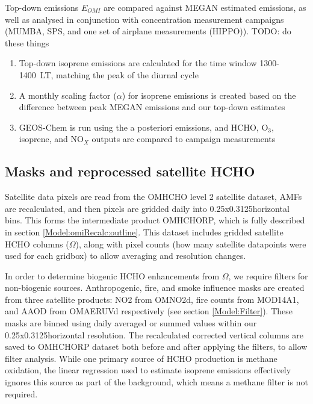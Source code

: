 \begin{enumerate}
        Top-down emissions $E_{OMI}$ are compared against MEGAN estimated emissions, as well as analysed in conjunction with concentration measurement campaigns (MUMBA, SPS, and one set of airplane measurements (HIPPO)).
        TODO: do these things
      \begin{enumerate}
        \item 
          Top-down isoprene emissions are calculated for the time window 1300-1400~LT, matching the peak of the diurnal cycle
        \item 
          A monthly scaling factor ($\alpha$) for isoprene emissions is created based on the difference between peak MEGAN emissions and our top-down estimates
        \item GEOS-Chem is run using the a posteriori emissions, and HCHO, O$_3$, isoprene, and NO$_X$ outputs are compared to campaign measurements
      \end{enumerate}
    \end{enumerate}
    
  
  \subsection{Masks and reprocessed satellite HCHO}
    
    Satellite data pixels are read from the OMHCHO level 2 satellite dataset, AMFs are recalculated, and then pixels are gridded daily into 0.25x0.3125\degr horizontal bins. 
    This forms the intermediate product OMHCHORP, which is fully described in section \ref{Model:omiRecalc:outline}.
    This dataset includes gridded satellite HCHO columns ($\Omega$), along with pixel counts (how many satellite datapoints were used for each gridbox) to allow averaging and resolution changes.
    
    In order to determine biogenic HCHO enhancements from $\Omega$, we require filters for non-biogenic sources.
    Anthropogenic, fire, and smoke influence masks are created from three satellite products: NO2 from OMNO2d, fire counts from MOD14A1, and AAOD from OMAERUVd respectively (see section \ref{Model:Filter}).
    These masks are binned using daily averaged or summed values within our 0.25x0.3125\degr horizontal resolution.
    The recalculated corrected vertical columns are saved to OMHCHORP dataset both before and after applying the filters, to allow filter analysis.
    While one primary source of HCHO production is methane oxidation, the linear regression used to estimate isoprene emissions effectively ignores this source as part of the background, which means a methane filter is not required.
    
